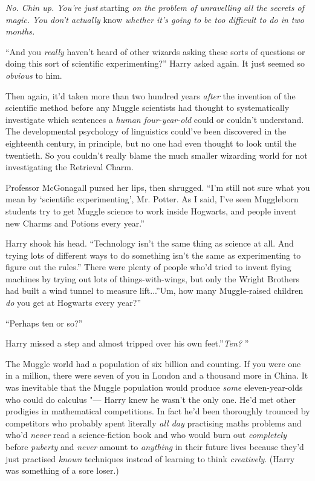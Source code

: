 \emph{No. Chin up. You're just} starting \emph{on the problem of
unravelling all the secrets of magic. You don't actually} know
\emph{whether it's going to be too difficult to do in two months.}

``And you \emph{really} haven't heard of other wizards asking these sorts
of questions or doing this sort of scientific experimenting?'' Harry
asked again. It just seemed so \emph{obvious} to him.

Then again, it'd taken more than two hundred years \emph{after} the
invention of the scientific method before any Muggle scientists had
thought to systematically investigate which sentences a \emph{human
four-year-old} could or couldn't understand. The developmental
psychology of linguistics could've been discovered in the eighteenth
century, in principle, but no one had even thought to look until the
twentieth. So you couldn't really blame the much smaller wizarding world
for not investigating the Retrieval Charm.

Professor McGonagall pursed her lips, then shrugged. ``I'm still not
sure what you mean by `scientific experimenting', Mr. Potter. As I said,
I've seen Muggleborn students try to get Muggle science to work inside
Hogwarts, and people invent new Charms and Potions every year.''

Harry shook his head. ``Technology isn't the same thing as science at
all. And trying lots of different ways to do something isn't the same as
experimenting to figure out the rules.'' There were plenty of people
who'd tried to invent flying machines by trying out lots of
things-with-wings, but only the Wright Brothers had built a wind tunnel
to measure lift...''Um, how many Muggle-raised children \emph{do}
you get at Hogwarts every year?''

``Perhaps ten or so?''

Harry missed a step and almost tripped over his own feet.''\emph{Ten?} ''

The Muggle world had a population of six billion and counting. If you
were one in a million, there were seven of you in London and a thousand
more in China. It was inevitable that the Muggle population would
produce \emph{some} eleven-year-olds who could do calculus "--- Harry knew
he wasn't the only one. He'd met other prodigies in mathematical
competitions. In fact he'd been thoroughly trounced by competitors who
probably spent literally \emph{all day} practising maths problems and
who'd \emph{never} read a science-fiction book and who would burn out
\emph{completely} before \emph{puberty} and \emph{never} amount to
\emph{anything} in their future lives because they'd just practised
\emph{known} techniques instead of learning to think \emph{creatively}.
(Harry was something of a sore loser.)

